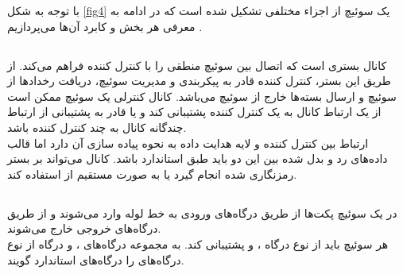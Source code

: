 با توجه به شکل \ref{fig4} یک سوئیچ  از اجزاء مختلفی تشکیل شده است که در ادامه به معرفی هر بخش و کابرد آن‌ها می‌پردازیم \cite{spec}.

\subsection{}
کانال  بستری است که اتصال بین سوئیچ منطقی را با کنترل کننده فراهم می‌کند. از طریق این بستر، کنترل کننده قادر به پیکربندی و مدیریت سوئیچ، دریافت رخداد‌ها از سوئیچ و ارسال بسته‌ها خارج از سوئیچ می‌باشد. کانال کنترلی یک سوئیچ ممکن است از یک ارتباط کانال  به یک کنترل کننده پشتیبانی کند و یا قادر به پشتیبانی از ارتباط چندگانه کانال  به چند کنترل کننده باشد.\\
ارتباط بین کنترل کننده و لایه هدایت داده به نحوه پیاده سازی آن دارد اما قالب داده‌های رد و بدل شده بین این دو باید طبق استاندارد  باشد. کانال  می‌تواند بر بستر رمزنگاری شده  انجام گیرد یا به صورت مستقیم از  استفاده کند.

\subsection{}
در یک سوئیچ  پکت‌ها از طریق درگاه‌های ورودی به خط لوله وارد می‌شوند و از طریق درگاه‌های خروجی خارج می‌شوند.\\
هر سوئیچ  باید از نوع درگاه ،  و  پشتیبانی کند. به مجموعه درگاه‌های ،  و درگاه  از نوع درگاه‌های  را درگاه‌های استاندارد گویند.

